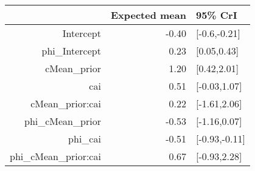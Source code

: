 \begin{tabular}{rrl}
  \hline
 & Expected mean & 95\% CrI \\ 
  \hline
Intercept & -0.40 & [-0.6,-0.21] \\ 
  phi\_Intercept & 0.23 & [0.05,0.43] \\ 
  cMean\_prior & 1.20 & [0.42,2.01] \\ 
  cai & 0.51 & [-0.03,1.07] \\ 
  cMean\_prior:cai & 0.22 & [-1.61,2.06] \\ 
  phi\_cMean\_prior & -0.53 & [-1.16,0.07] \\ 
  phi\_cai & -0.51 & [-0.93,-0.11] \\ 
  phi\_cMean\_prior:cai & 0.67 & [-0.93,2.28] \\ 
   \hline
\end{tabular}


